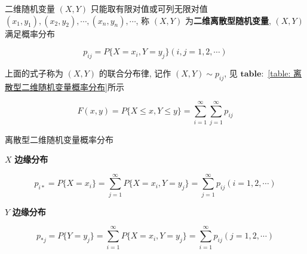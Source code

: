 \begin{definition}[概率分布]
	二维随机变量 $(X,Y)$ 只能取有限对值或可列无限对值 $(x_{1},y_{1}), (x_{2},y_{2}), \cdots, (x_{n},y_{n}), \cdots$, 称 $(X,Y)$ 为\textbf{二维离散型随机变量}, $(X,Y)$满足概率分布

	$$p_{ij} = P\{X = x_{i}, Y = y_{j}\} (i,j = 1,2,\cdots)$$
	
	上面的式子称为 $(X,Y)$ 的联合分布律, 记作 $(X,Y)\sim p_{ij}$, 见 $\mathbf{table: }$ \ref{table: 离散型二维随机变量概率分布}所示

	$$F(x,y)=P\{X\leq x,Y\leq y\}=\sum\limits_{i=1}^{\infty}\sum\limits_{j=1}^{\infty}p_{ij}$$
\end{definition}
\begin{table}[H]
	\centering
	\caption{离散型二维随机变量概率分布}
	\label{table: 离散型二维随机变量概率分布}
	
\end{table}

\begin{definition}[边缘分布]
	$X$ \textbf{边缘分布}
	
	$$p_{i*} = P\{X = x_{i}\} = \sum\limits_{j = 1}^{\infty}P\{X = x_{i}, Y = y_{j}\} = \sum\limits_{j = 1}^{\infty}p_{ij} (i = 1,2,\cdots)$$
	
	$Y$ \textbf{边缘分布}
	
	$$p_{*j} = P\{Y = y_{j}\} = \sum\limits_{i = 1}^{\infty}P\{X = x_{i}, Y = y_{j}\} = \sum\limits_{i = 1}^{\infty}p_{ij} (j = 1,2,\cdots)$$
\end{definition}

